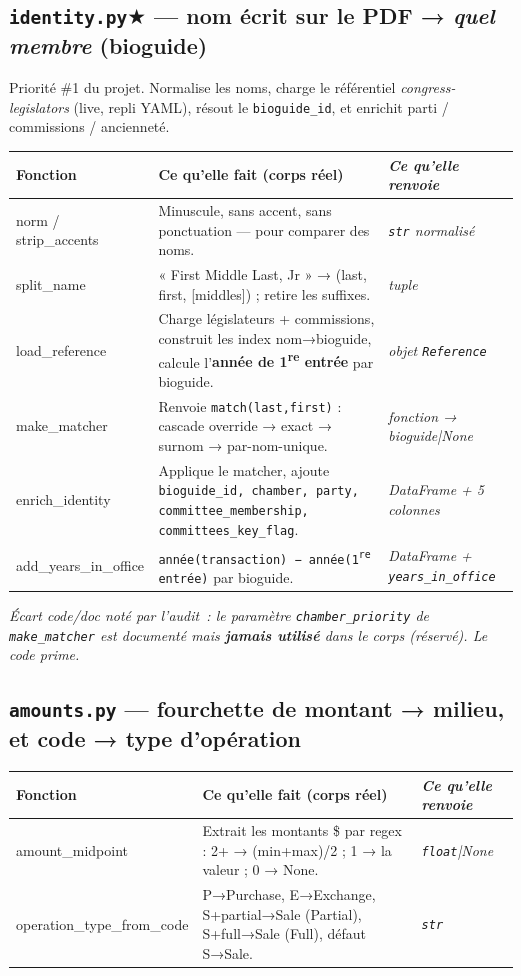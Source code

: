 \documentclass[11pt,a4paper]{article}
\newcommand{\co}[1]{\texttt{\small #1}}
\newenvironment{fntab}{%
  \par\small
  \begin{longtable}{>{\ttfamily\footnotesize}p{3.0cm} p{9.1cm} >{\itshape\footnotesize}p{3.4cm}}
  \toprule
  \normalfont\bfseries Fonction & \bfseries Ce qu'elle fait (corps réel) & \normalfont\bfseries Ce qu'elle renvoie\\
  \midrule\endhead
}{\bottomrule\end{longtable}\par}
\begin{document}
\subsection{\texttt{identity.py}\;$\bigstar$ — nom écrit sur le PDF → \emph{quel membre} (bioguide)}
Priorité \#1 du projet. Normalise les noms, charge le référentiel \emph{congress-legislators} (live, repli
YAML), résout le \co{bioguide_id}, et enrichit parti / commissions / ancienneté.
\begin{fntab}
norm / strip_accents & Minuscule, sans accent, sans ponctuation — pour comparer des noms. & \co{str} normalisé \\
split_name & « First Middle Last, Jr » → (last, first, [middles]) ; retire les suffixes. & tuple \\
load_reference & Charge législateurs + commissions, construit les index nom→bioguide, calcule l'\textbf{année de 1\textsuperscript{re} entrée} par bioguide. & objet \co{Reference} \\
make_matcher & Renvoie \co{match(last,first)} : cascade override → exact → surnom → par-nom-unique. & fonction → bioguide|None \\
enrich_identity & Applique le matcher, ajoute \co{bioguide_id, chamber, party, committee_membership, committees_key_flag}. & DataFrame + 5 colonnes \\
add_years_in_office & \co{année(transaction) − année(1\textsuperscript{re} entrée)} par bioguide. & DataFrame + \co{years_in_office} \\
\end{fntab}
\textit{Écart code/doc noté par l'audit~: le paramètre \co{chamber_priority} de \co{make_matcher} est
documenté mais \textbf{jamais utilisé} dans le corps (réservé). Le code prime.}

\subsection{\texttt{amounts.py} — fourchette de montant → milieu, et code → type d'opération}
\begin{fntab}
amount_midpoint & Extrait les montants \$ par regex : 2+ → (min+max)/2 ; 1 → la valeur ; 0 → None. & \co{float}|None \\
operation_type_from_code & P→Purchase, E→Exchange, S+partial→Sale (Partial), S+full→Sale (Full), défaut S→Sale. & \co{str} \\
\end{fntab}
\end{document}
